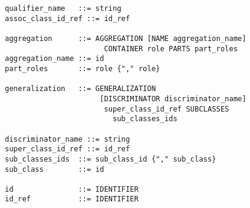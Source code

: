 \begin{scriptsize}
\begin{verbatim}
qualifier_name   ::= string
assoc_class_id_ref ::= id_ref

aggregation      ::= AGGREGATION [NAME aggregation_name]
                       CONTAINER role PARTS part_roles
aggregation_name ::= id
part_roles       ::= role {"," role}

generalization   ::= GENERALIZATION
                      [DISCRIMINATOR discriminator_name]
                       super_class_id_ref SUBCLASSES
                         sub_classes_ids

discriminator_name ::= string
super_class_id_ref ::= id_ref
sub_classes_ids  ::= sub_class_id {"," sub_class}
sub_class        ::= id

id               ::= IDENTIFIER
id_ref           ::= IDENTIFIER
\end{verbatim}
\end{scriptsize}


